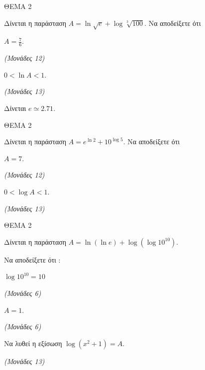 \documentclass[11pt,a4paper,twoside]{book}
\newcommand{\monades}[1]{\hfill \textit{(Μονάδες #1)}}
\begin{document}
\vspace{4mm}

ΘΕΜΑ 2

Δίνεται η παράσταση $A = \ln \sqrt{e} + \log \sqrt[3]{100}$. Να αποδείξετε ότι

\begin{alist}
\item $A = \frac{7}{6}$.

\monades{12}

\item $0 < \ln A < 1$.

\monades{13}

Δίνεται $e \simeq 2.71$.
\end{alist}

\vspace{4mm}

ΘΕΜΑ 2

Δίνεται η παράσταση $A = e^{\ln 2} + 10^{\log 5}$. Να αποδείξετε ότι

\begin{alist}
\item $A = 7$.

\monades{12}

\item $0 < \log A < 1$.

\monades{13}
\end{alist}

\vspace{4mm}

ΘΕΜΑ 2

Δίνεται η παράσταση $A = \ln(\ln e) + \log(\log 10^{10})$.

\begin{alist}
\item Να αποδείξετε ότι :

\begin{rlist}
\item $\log 10^{10} = 10$

\monades{6}

\item $A = 1$.

\monades{6}

\end{rlist}
\item Να λυθεί η εξίσωση $\log(x^2 + 1) = A$.

\monades{13}
\end{alist}

\vspace{4mm}
\end{document}
